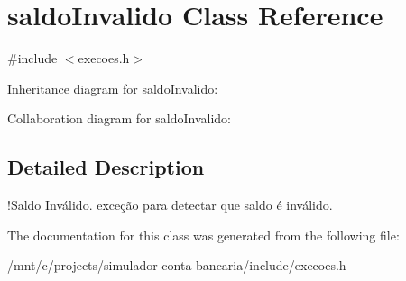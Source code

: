 \hypertarget{classsaldoInvalido}{}\section{saldo\+Invalido Class Reference}
\label{classsaldoInvalido}


{\ttfamily \#include $<$execoes.\+h$>$}



Inheritance diagram for saldo\+Invalido\+:


Collaboration diagram for saldo\+Invalido\+:


\subsection{Detailed Description}
!\+Saldo Inválido. exceção para detectar que saldo é inválido. 

The documentation for this class was generated from the following file\+:\begin{DoxyCompactItemize}
\item 
/mnt/c/projects/simulador-\/conta-\/bancaria/include/execoes.\+h\end{DoxyCompactItemize}
